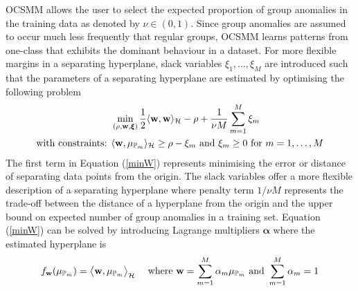 OCSMM allows the user to select the expected proportion of group anomalies in the training data as denoted by  $\nu \in (0,1)$.  Since group anomalies are assumed to occur much less frequently that regular groups,  OCSMM learns patterns from one-class that exhibits  the dominant behaviour in a dataset.  
For more flexible margins in a separating hyperplane, 
slack variables $\xi_1,\dots,\xi_M$ are  introduced such that the parameters  of a separating hyperplane are estimated by optimising the following problem %
 \begin{align}
&\min_{(  \rho, {\bf w},\boldsymbol \xi)} 
\frac{1}{2} \langle {\bf w},{\bf w} \rangle_{\small \mathcal{H}} - \rho +  \frac{1}{\nu M} \sum_{m=1}^M
\xi_m  \label{minW} \\
\mbox{with con}\mbox{straints: } &  \langle {\bf w} ,  \mu_{\mathbb{P}_m } \rangle_\mathcal{H} \ge \rho - \xi_m \mbox{ and } \xi_m \ge 0 \mbox{ for } m=1,\dots,M   \nonumber
\end{align}
 The first term in Equation (\ref{minW}) represents  minimising the error or distance of separating data points from the origin. The slack variables offer a more flexible description of a separating hyperplane where penalty term $1/{\nu M}$ represents the trade-off between the distance of a hyperplane from the origin and the upper bound on expected number of group anomalies in a training set.  
Equation (\ref{minW}) can be solved by introducing Lagrange multipliers $\boldsymbol \alpha$ where the estimated hyperplane is %
\begin{align*}
 f_{\bf w}(\mu_{\mathbb{P}_m } ) = \big\langle {\bf w},\mu_{\mathbb{P}_m } \big \rangle_\mathcal{H} \quad %
\mbox{ where }{\bf w}= \sum_{m=1}^M \alpha_m  \mu_{\mathbb{P}_m} \mbox{ and } \sum_{m=1}^M \alpha_m=1
\end{align*} 
 
